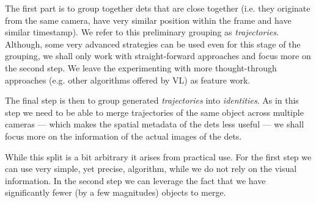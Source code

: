 The first part is to group together \glspl{det} that are 
close together (i.e. they originate from the same camera, have very similar
position within the frame and have similar timestamp). We refer to this
preliminary grouping as \emph{trajectories}. Although, some very advanced
strategies can be used even for this stage of the grouping, we shall only work
with straight-forward approaches and focus more on the second step. We leave
the experimenting with more thought-through approaches (e.g. other algorithms
offered by \gls{VL}) as feature work.

The final step is then to group generated \emph{trajectories} into
\emph{identities}. As in this step we need to be able to merge trajectories
of the same object across multiple cameras --- which makes the spatial metadata
of the \glspl{det} less useful --- we shall focus more on the information
of the actual images of the \glspl{det}.

While this split is a bit arbitrary it arises from practical use. For the
first step we can use very simple, yet precise, algorithm, while we do not rely
on the visual information. In the second step we can leverage the fact
that we have significantly fewer (by a few magnitudes) objects to merge.



